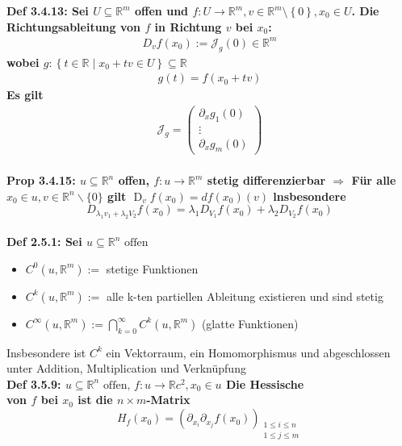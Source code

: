 \documentclass[7pt,landscape, margin = 0.1mm]{article}
\newcommand{\COL}[1]{ \color{chaptercolor} \bf{#1}\color{black}     \\}
\newcommand{\DEF}[2]{\color{chaptercolor}\bf{Def #1}:\color{black}    \hspace{0.2cm} #2 \\}
\newcommand{\PROP}[2]{\color{chaptercolor}\bf{Prop #1}:\color{black}    \hspace{0.2cm} #2 \\}
\begin{document}
\begin{multicols}{4}
\begin{flushleft}
\DEF{3.4.13}{ Sei $U \subseteq \mathbb{R}^{m}$ offen und $f: U \longrightarrow \mathbb{R}^{m}, v\in \mathbb{R}^{m}\setminus \left\{0 \right\}, x_{0}\in U$. Die Richtungsableitung von $f$ in Richtung $v$ bei $x_{0}$:
  \begin{align*} D_{v}f(x_{0}):= \mathcal{J}_{g} (0)\in \mathbb{R}^{m} \end{align*} 
wobei  $g: \left\{ t \in \mathbb{R} \mid x_{0}+tv \in U \right\} \subseteq \mathbb{R}$
\begin{align*} g(t)=f(x_{0}+tv)\end{align*}  Es gilt  \begin{align*} \mathcal{J}_{g}=\left(\begin{array}{c}
\partial_x g_1(0) \\
\vdots \\
\partial_x g_m(0)
\end{array}\right) \end{align*} } 

\PROP{3.4.15}{$u \subseteq \mathbb{R}^n$ offen, $f: u \rightarrow \mathbb{R}^m$ stetig differenzierbar $\Rightarrow$ Für alle $x_0 \in u, v \in \mathbb{R}^n \backslash\{0\}$ gilt $\operatorname{D}_v f\left(x_0\right)=d f\left(x_0\right)(v)$ lnsbesondere$$
D_{\lambda_1 v_1+\lambda_2 V_2} f\left(x_0\right)=\lambda_1 D_{V_1} f\left(x_0\right)+\lambda_2 D_{V_2} f\left(x_0\right)
$$}

\DEF{2.5.1}{Sei $u \subseteq \mathbb{R}^n \text { offen }$ 
\begin{itemize}


\item $C^0\left(u, \mathbb{R}^m\right):=$ stetige Funktionen
\item $C^{k}\left(u, \mathbb{R}^m\right):=$ alle k-ten partiellen Ableitung existieren und sind stetig
\item $C^{\infty}\left(u, \mathbb{R}^m\right):=\bigcap_{k=0}^{\infty} C^k\left(u, \mathbb{R}^m\right)$ (glatte Funktionen)

\end{itemize}

Insbesondere ist $C^{k}$ ein Vektorraum, ein Homomorphismus und abgeschlossen unter Addition, Multiplication und Verknüpfung}
 
\DEF{3.5.9}{$u \subseteq \mathbb{R}^n \text { offen, } f: u \rightarrow \mathbb{R} c^2, x_0 \in u$ Die \COL{Hessische} von $f$ bei $x_0$ ist die $n \times m$-Matrix $$
H_f\left(x_0\right)=\left(\partial_{x_i} \partial_{x_j} f\left(x_0\right)\right)_{\substack{1 \leq i \leq n \\ 1 \leq j \leq m}}$$}


\end{flushleft}
\end{multicols}
\end{document}
